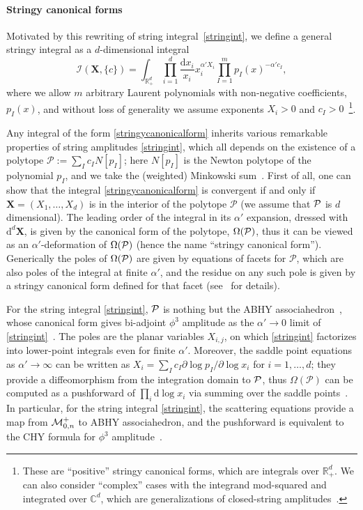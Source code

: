 \documentclass[hidelinks,12pt]{article}
\begin{document}
\paragraph{Stringy canonical forms} Motivated by this rewriting of string integral~\eqref{stringint}, we define a general stringy integral as a $d$-dimensional integral~\cite{Arkani-Hamed:2019mrd}
\begin{equation}\label{stringycanonicalform}
	\mathcal I (\mathbf X,\{c\})=
	\int_{\mathbb R_+^d}\prod_{i=1}^d \frac{\mathrm d x_i}{x_i}x_i^{\alpha'X_i}
	\prod_{I=1}^m p_I(x)^{-\alpha' c_I},
\end{equation}
where we allow $m$ arbitrary Laurent polynomials with non-negative coefficients, $p_I(x)$, and without loss of generality we assume exponents $X_i>0$ and $c_I>0$~\footnote{These are ``positive'' stringy canonical forms, which are integrals over $\mathbb R_+^d$. We can also consider ``complex'' cases with the integrand mod-squared and integrated over $\mathbb C^d$, which are generalizations of closed-string amplitudes~\cite{Arkani-Hamed:2019mrd}.}. 

Any integral of the form \eqref{stringycanonicalform} inherits various remarkable properties of string amplitudes \eqref{stringint}, which all depends on the existence of a polytope $\mathcal P:=\sum_I c_I N[p_I]$; here $N[p_I]$ is the Newton polytope of the polynomial $p_I$, and we take the (weighted) Minkowski sum~\cite{Arkani-Hamed:2019mrd}. First of all, one can show that the integral \eqref{stringycanonicalform} is convergent if and only if $\mathbf X=(X_1,\dots,X_d)$ is in the interior of the polytope $\mathcal P$ (we assume that ${\cal P}$ is $d$ dimensional). The leading order of the integral in its $\alpha'$ expansion, dressed with $\mathrm{d}^d \mathbf X$, is given by the canonical form of the polytope, ${\Omega}(\cal P)$, thus it can be viewed as an $\alpha'$-deformation of $\Omega(\cal P)$ (hence the name ``stringy canonical form''). Generically the poles of $\Omega(\cal P)$ are given by equations of
facets for $\mathcal P$, which are also poles of the integral at finite $\alpha'$, and the residue on any such pole is given by a stringy canonical form defined for that facet (see~\cite{Arkani-Hamed:2019mrd} for details). 

For the string integral \eqref{stringint}, ${\cal P}$ is nothing but the ABHY associahedron~\cite{Arkani-Hamed:2017mur}, whose canonical form gives bi-adjoint $\phi^3$ amplitude as the $\alpha'\to 0$ limit of \eqref{stringint}~\cite{Cachazo:2013iea}. The poles are the planar variables $X_{i,j}$, on which \eqref{stringint} factorizes into lower-point integrals even for finite $\alpha'$. Moreover, the saddle point equations as $\alpha' \to \infty$ can be written as $X_i=\sum_I c_I \partial \log p_I/\partial \log x_i$ for $i=1,\dots, d$; they provide a diffeomorphism from the integration domain to ${\cal P}$, thus $\Omega(\mathcal P)$ can be computed as a pushforward of $\prod_i \mathrm{d}\log x_i$ via summing over the saddle points~\cite{Arkani-Hamed:2017tmz}. In particular, for the string integral \eqref{stringint}, the scattering equations provide a map from ${\cal M}_{0,n}^+$ to ABHY associahedron, and the pushforward is equivalent to the CHY formula for $\phi^3$ amplitude~\cite{Cachazo:2013hca,Cachazo:2013iea}. 
\end{document}
